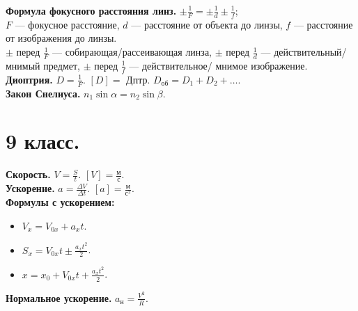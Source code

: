 \documentclass{article}
\begin{document}
	\textbf{Формула фокусного расстояния линз.} $\pm \frac{1}{F} = \pm \frac{1}{d} \pm \frac{1}{f}$; \\
	$F$ --- фокусное расстояние, $d$ --- расстояние от объекта до линзы, $f$ --- расстояние от изображения до линзы. \\
	$\pm$ перед $\frac{1}{F}$ --- собирающая/рассеивающая линза, $\pm$ перед $\frac{1}{d}$ --- действительный/мнимый предмет, $\pm$ перед $\frac{1}{f}$ --- действительное/ мнимое изображение. \\
	\textbf{Диоптрия.} $D = \frac{1}{F}$. $[D] =$ Дптр. $D_{\text{об}} = D_1 + D_2 + \dots$. \\
	\textbf{Закон Снелиуса.} $n_1 \sin\alpha = n_2 \sin\beta$.
	
	
	
	
	
	\section{9 класс.}
	\textbf{Скорость.} $V = \frac{S}{t}$. $[V] = \frac{\text{м}}{\text{с}}$. \\
	\textbf{Ускорение.} $a = \frac{\varDelta V}{\varDelta t}$. $[a] = \frac{\text{м}}{\text{с}^2}$. \\
	\textbf{Формулы с ускорением:}
	\begin{itemize}
		\item $V_x = V_{0x} + a_xt$.
		\item $S_x = V_{0x}t \pm \frac{a_xt^2}{2}$.
		\item $x = x_0 + V_{0x}t + \frac{a_xt^2}{2}$.
	\end{itemize}
	\textbf{Нормальное ускорение.} $a_{\text{н}} = \frac{V^2}{R}$. \\
\end{document}
